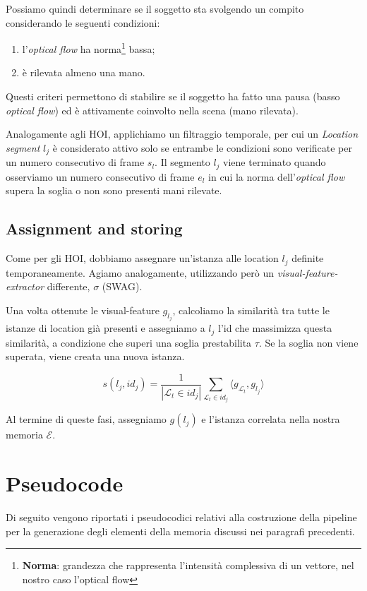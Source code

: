 Possiamo quindi determinare se il soggetto sta svolgendo un compito considerando le seguenti condizioni:
\begin{enumerate}
    \item l'\emph{optical flow} ha norma\footnote{\textbf{Norma}: grandezza che rappresenta l'intensità complessiva di un vettore, nel nostro caso l'optical flow} bassa;
    \item è rilevata almeno una mano.
\end{enumerate}
Questi criteri permettono di stabilire se il soggetto ha fatto una pausa (basso \emph{optical flow}) ed è attivamente coinvolto nella scena (mano rilevata).

Analogamente agli HOI, applichiamo un filtraggio temporale, per cui un \emph{Location segment} $l_j$ è considerato attivo solo se entrambe le condizioni sono verificate per un numero consecutivo di frame $s_l$. Il segmento $l_j$ viene terminato quando osserviamo un numero consecutivo di frame $e_l$ in cui la norma dell'\emph{optical flow} supera la soglia o non sono presenti mani rilevate.

\subsection*{Assignment and storing}
Come per gli HOI, dobbiamo assegnare un'istanza alle location $l_j$ definite temporaneamente. Agiamo analogamente, utilizzando però un \emph{visual-feature-extractor} differente, $\sigma$ (SWAG)\cite{singh2022revisitingweaklysupervisedpretraining}.

Una volta ottenute le visual-feature $g_{l_j}$, calcoliamo la similarità tra tutte le istanze di location già presenti e assegniamo a $l_j$ l'id che massimizza questa similarità, a condizione che superi una soglia prestabilita $\tau$. Se la soglia non viene superata, viene creata una nuova istanza.

\[
s(l_j, id_j) = \frac{1}{|\mathcal{L}_t \in id_j|} \sum_{\mathcal{L}_t \in id_j} \langle g_{\mathcal{L}_t}, g_{l_j} \rangle
\]

Al termine di queste fasi, assegniamo $g(l_j)$ e l'istanza correlata nella nostra memoria $\mathcal{E}$.

\section{Pseudocode}

Di seguito vengono riportati i pseudocodici relativi alla costruzione della pipeline per la generazione degli elementi della memoria discussi nei paragrafi precedenti.


